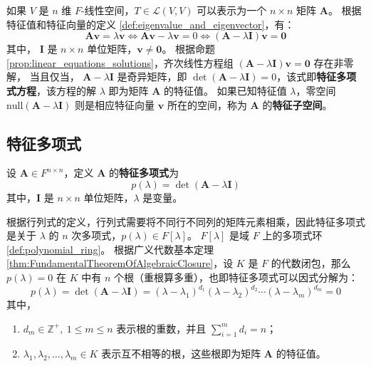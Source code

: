 如果 $V$ 是 $n$ 维 $F$-线性空间，$T\in \mathcal{L}(V,V)$ 可以表示为一个 $n\times n$ 矩阵 $\mathbf{A}$。
根据特征值和特征向量的定义 \ref{def:eigenvalue_and_eigenvector}，有：
\[
    \mathbf{A}\mathbf{v} = \lambda \mathbf{v} \iff \mathbf{A}\mathbf{v} - \lambda \mathbf{v} = 0 \iff (\mathbf{A} - \lambda \mathbf{I})\mathbf{v} = \mathbf{0}
\]
其中， $\mathbf{I}$ 是 $n\times n$ 单位矩阵，$\mathbf{v} \neq \mathbf{0}$。
根据命题 \ref{prop:linear_equations_solutions}，齐次线性方程组 $(\mathbf{A} - \lambda \mathbf{I})\mathbf{v} = \mathbf{0}$ 存在非零解，
当且仅当， $\mathbf{A} - \lambda \mathbf{I}$ 是奇异矩阵，即 $\det(\mathbf{A} - \lambda \mathbf{I}) = 0$，该式即\textbf{特征多项式方程}，该方程的解 $\lambda$ 即为矩阵 $\mathbf{A}$ 的特征值。
如果已知特征值 $\lambda$，零空间 $\mathrm{null}(\mathbf{A} - \lambda \mathbf{I})$ 则是相应特征向量 $\mathbf{v}$ 所在的空间，称为 $\mathbf{A}$ 的\textbf{特征子空间}。

\vspace{1em}

\subsection{特征多项式}

\begin{definition}
    设 $\mathbf{A} \in F^{n \times n}$，定义 $\mathbf{A}$ 的\textbf{特征多项式}为
    \begin{equation}
        p(\lambda) = \det(\mathbf{A} - \lambda \mathbf{I})
        \label{eq:characteristic_polynomial}
    \end{equation}
    其中，$\mathbf{I}$ 是 $n\times n$ 单位矩阵，$\lambda$ 是变量。
    \label{def:characteristic_polynomial}
\end{definition}

\begin{note}
    根据行列式的定义，行列式需要将不同行不同列的矩阵元素相乘，因此特征多项式是关于 $\lambda$ 的 $n$ 次多项式，$p(\lambda)\in F[\lambda]$。
    $F[\lambda]$ 是域 $F$ 上的多项式环 \ref{def:polynomial_ring}。
    根据广义代数基本定理 \ref{thm:FundamentalTheoremOfAlgebraicClosure}，设 $K$ 是 $F$ 的代数闭包，那么 $p(\lambda)=0$ 在 $K$ 中有 $n$ 个根（重根算多重），也即特征多项式可以因式分解为：
    \begin{equation}
        p(\lambda) = \det(\mathbf{A} - \lambda \mathbf{I}) = (\lambda-\lambda_1)^{d_1}(\lambda-\lambda_2)^{d_2}\cdots(\lambda-\lambda_m)^{d_m} =0
        \label{eq:characteristic_polynomial_factorization}
    \end{equation}
    其中，
    \begin{enumerate}
        \item $d_m\in \mathbb{Z}^+,\ 1 \leq m \leq n$ 表示根的重数，并且 $\sum_{i=1}^{m} d_i = n$；
        \item $\lambda_1,\lambda_2,\ldots,\lambda_m \in K$ 表示互不相等的根，这些根即为矩阵 $\mathbf{A}$ 的特征值。
    \end{enumerate}
\end{note}


